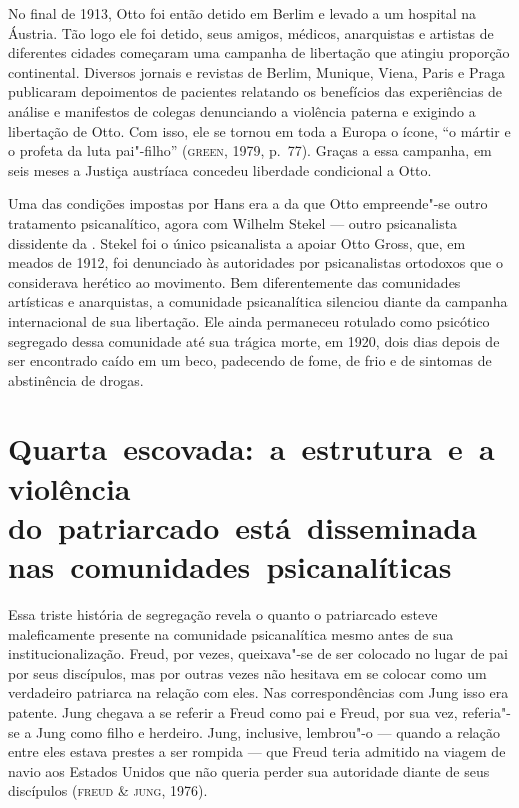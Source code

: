 No final de 1913, Otto foi então detido em Berlim e levado a um hospital
na Áustria. Tão logo ele foi detido, seus amigos, médicos, anarquistas e
artistas de diferentes cidades começaram uma campanha de libertação que
atingiu proporção continental. Diversos jornais e revistas de Berlim,
Munique, Viena, Paris e Praga publicaram depoimentos de pacientes
relatando os benefícios das experiências de análise e manifestos de
colegas denunciando a violência paterna e exigindo a libertação de Otto.
Com isso, ele se tornou em toda a Europa o ícone, ``o mártir e o profeta
da luta pai"-filho'' (\textsc{green}, 1979, p.~77). Graças a essa campanha, em seis meses a Justiça
austríaca concedeu liberdade condicional a Otto.

Uma das condições impostas por Hans era a da que Otto empreende"-se outro
tratamento psicanalítico, agora com Wilhelm Stekel --- outro psicanalista
dissidente da . Stekel foi o único psicanalista a apoiar Otto Gross, que, em meados de 1912, foi denunciado às autoridades por psicanalistas ortodoxos que o considerava herético ao
movimento. Bem diferentemente das comunidades artísticas e anarquistas, a
comunidade psicanalítica silenciou diante da campanha
internacional de sua libertação. Ele ainda permaneceu rotulado como psicótico segregado dessa
comunidade até sua trágica morte, em 1920, dois dias depois de ser
encontrado caído em um beco, padecendo de fome, de frio e de sintomas de
abstinência de drogas.

\section{Quarta~escovada:~a~estrutura~e~a~violência do~patriarcado~está~disseminada nas~comunidades~psicanalíticas}

Essa triste história de segregação revela o quanto o patriarcado esteve
maleficamente presente na comunidade psicanalítica mesmo antes de sua
institucionalização. Freud, por vezes, queixava"-se de ser colocado no
lugar de pai por seus discípulos, mas por outras vezes não hesitava em
se colocar como um verdadeiro patriarca na relação com eles. Nas
correspondências com Jung isso era patente. Jung chegava a se referir a
Freud como pai e Freud, por sua vez, referia"-se a Jung como filho e
herdeiro. Jung, inclusive, lembrou"-o --- quando a relação entre eles
estava prestes a ser rompida --- que Freud teria admitido na viagem de
navio aos Estados Unidos que não queria perder sua autoridade diante de
seus discípulos (\textsc{freud} \& \textsc{jung}, 1976).

